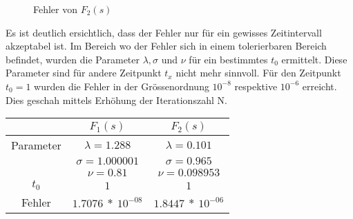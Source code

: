 \begin{figure}
\centering
\caption{Fehler von $F_{2}(s)$
\label{laplace:fehlerf2-5}
}
\end{figure}


Es ist deutlich ersichtlich, dass der Fehler nur für ein gewisses Zeitintervall akzeptabel ist. Im Bereich wo der Fehler sich in einem tolerierbaren Bereich befindet, wurden die Parameter $\lambda, \sigma $ und $\nu $ für ein bestimmtes $t_{0}$ ermittelt. 
Diese Parameter sind für andere Zeitpunkt $t_{x}$ nicht mehr sinnvoll. 
Für den Zeitpunkt $t_{0}=1$ wurden die Fehler in der Grössenordnung $10^{-8}$ respektive $10^{-6}$ erreicht. 
Dies geschah mittels Erhöhung der Iterationszahl N.

\begin{center}
\begin{tabular}[c]{c|c|c}
& $F_{1}(s)$ & $F_{2}(s)$ \\
\hline
Parameter & $\lambda=1.288$ & $\lambda=0.101$ \\
 & $\sigma=1.000001$ & $\sigma=0.965$ \\
 & $\nu=0.81$ & $\nu=0.098953$ \\
\hline
$t_{0}$ & $1$ & $1$ \\
\hline
Fehler & $1.7076~*~10^{-08}$ & $1.8447~*~10^{-06}$ \\
\end{tabular}
\end{center}


